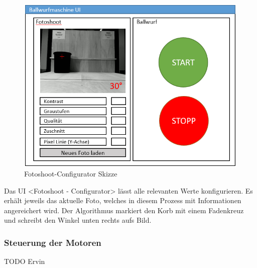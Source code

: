 \begin{figure}[h!]
	\centering
	\includegraphics[scale=0.75]{../../fig/fotoshoot-configurator.png}
	\caption{Fotoshoot-Configurator Skizze}
\end{figure}

Das UI <Fotoshoot - Configurator> lässt alle relevanten Werte konfigurieren. Es erhält jeweils das aktuelle Foto, welches in diesem Prozess mit Informationen angereichert wird. Der Algorithmus markiert den Korb mit einem Fadenkreuz und schreibt den Winkel unten rechts aufs Bild.

\subsubsection{Steuerung der Motoren}
TODO Ervin